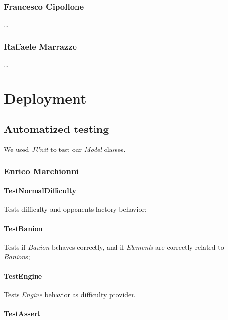 \documentclass[12pt, a4paper]{report}
\begin{document}
        \pagebreak

    \subsection*{Francesco Cipollone}

    \dots

    \subsection*{Raffaele Marrazzo}

    \dots

\chapter{Deployment}

\section{Automatized testing}

    We used \emph{JUnit} to test our \emph{Model} classes.

    \subsection*{Enrico Marchionni}

    \subsubsection{TestNormalDifficulty}
    
    Tests difficulty and opponents factory behavior;

    \subsubsection{TestBanion}
    
    Tests if \emph{Banion} behaves correctly, and if \emph{Element}s are correctly related to \emph{Banion}s;

    \subsubsection{TestEngine}
    
    Tests \emph{Engine} behavior as difficulty provider.

    \subsubsection{TestAssert}
    
\end{document}

